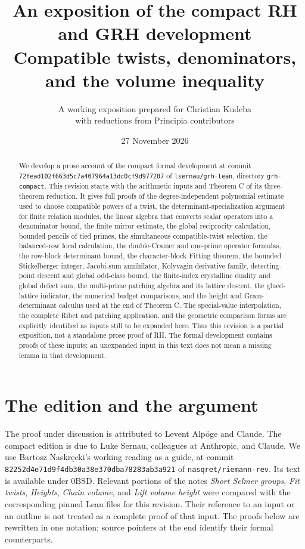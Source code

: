 \documentclass[11pt,a4paper]{article}
\title{An exposition of the compact RH and GRH development\\[4pt]
\large Compatible twists, denominators, and the volume inequality}
\author{A working exposition prepared for Christian Kudeba\\
with reductions from Principia contributors}
\date{27 November 2026}
\theoremstyle{definition}
\begin{document}
\maketitle
\begin{abstract}
We develop a prose account of the compact formal development at commit
\texttt{72fead102f663d5c7a407964a13dc0cf9d977207} of
\texttt{lsernau/grh-lean}, directory \texttt{grh-compact}.
This revision starts with the arithmetic inputs and Theorem C of its three-theorem reduction.
It gives full proofs of the degree-independent polynomial estimate used to choose compatible
powers of a twist, the determinant-specialization argument for finite relation modules,
the linear algebra that converts scalar operators into a denominator bound, the finite mirror estimate, the global reciprocity calculation, bounded pencils of tied primes,
the simultaneous compatible-twist selection, the balanced-row local calculation,
the double-Cramer and one-prime operator formulas, the row-block determinant bound, the character-block Fitting theorem,
the bounded Stickelberger integer, Jacobi-sum annihilator,
Kolyvagin derivative family, detecting-point descent and global odd-class bound,
the finite-index crystalline duality and global defect sum,
the multi-prime patching algebra and its lattice descent, the glued-lattice indicator,
the numerical budget comparisons, and the
height and Gram-determinant calculus used at the end of Theorem C.
The special-value interpolation, the complete Ribet and patching application,
and the geometric comparison forms are explicitly identified as inputs still to be
expanded here. Thus this revision is a partial exposition, not a standalone prose proof
of RH. The formal development contains proofs of these inputs; an unexpanded input in
this text does not mean a missing lemma in that development.
\end{abstract}
\tableofcontents

\section{The edition and the argument}
The proof under discussion is attributed to Levent Alp\"oge and Claude.
The compact edition is due to Luke Sernau, colleagues at Anthropic, and Claude.
We use Bartosz Naskr\k{e}cki's working reading as a guide, at commit
\texttt{82252d4e71d9f4db30a38e370dba78283ab3a921} of
\texttt{nasqret/riemann-rev}. Its text is available under 0BSD.
Relevant portions of the notes \emph{Short Selmer groups}, \emph{Fit twists}, \emph{Heights},
\emph{Chain volume}, and \emph{Lift volume height} were compared with the corresponding
pinned Lean files for this revision. Their reference to an input or an outline is
not treated as a complete proof of that input. The proofs below are rewritten in one
notation; source pointers at the end identify their formal counterparts.
\end{document}
